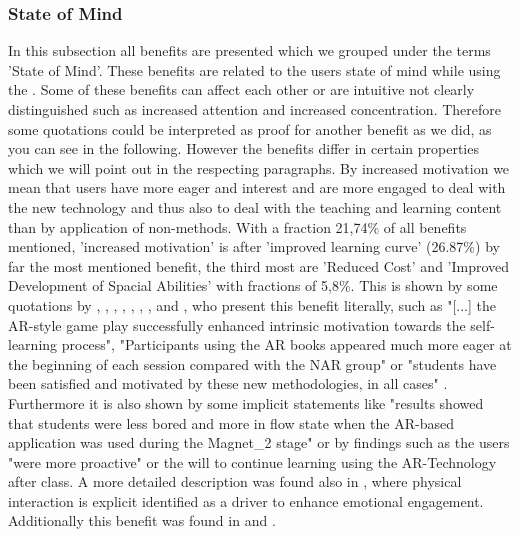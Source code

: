 \subsubsection{State of Mind}
In this subsection all benefits are presented which we grouped under the terms 'State of Mind'. These benefits are related to the users state of mind while using the \AR \appns. Some of these benefits can affect 
each other or are intuitive not clearly distinguished such as increased attention and increased concentration. Therefore some quotations could be interpreted as proof for another benefit as we did, as you can see in the following.
However the benefits differ in certain properties which we will point out in the respecting paragraphs.
By increased motivation we mean that users have more eager and interest and are more engaged to deal with the new technology and thus also to deal with the teaching and learning content than by application of non-\AR methods. With a fraction 21,74\% of all benefits mentioned, 
'increased motivation' is after 'improved learning curve' (26.87\%) by far the most mentioned benefit, the third most are 'Reduced Cost' and 'Improved Development of Spacial Abilities' with fractions of 5,8\%.
This is shown by some quotations by \cite{Dunser.2012}, \cite{Iwata.2011}, 
\cite{Kamarainen.2013}, \cite{Liu.2009b}, \cite{MartinGutierrez.2011}, \cite{MartinGutierrez.2011}, \cite{Redondo.2013}, \cite{VateULan.2012} and \cite{Yen.2013}, who present this benefit literally, such as "[...] the AR-style game play successfully enhanced intrinsic motivation towards the self-learning process"\autocite[113]{Iwata.2011}, "Participants 
using the AR books appeared much more eager at the beginning of each session compared with the NAR group"\autocite[112]{Dunser.2012} or "students have been satisfied and motivated by these new methodologies, in all cases"
\autocite[60]{Redondo.2013}. Furthermore it is also shown by some implicit statements like "results showed that students were less bored and more in flow state
when the AR-based application was used during the Magnet\_2 stage"\autocite[8]{Ibanez.2014} or by findings such as the users "were more proactive"\autocite[10]{Chang.2014}\mulcit\autocite[cf.][187]{Zhang.2014} or the will to continue learning using
the AR-Technology after class\autocite[8]{Liu.2009b}. A more detailed description was found also in \cite{Iwata.2011}, where physical interaction is explicit identified as a driver to enhance emotional
engagement.\autocite[cf.][8]{Iwata.2011} Additionally this benefit was found in \cite{Li.2011} and \cite{Hou.2013}.\autocite[cf.][322]{Li.2011}\mulcit\autocite[cf.][448]{Hou.2013}
